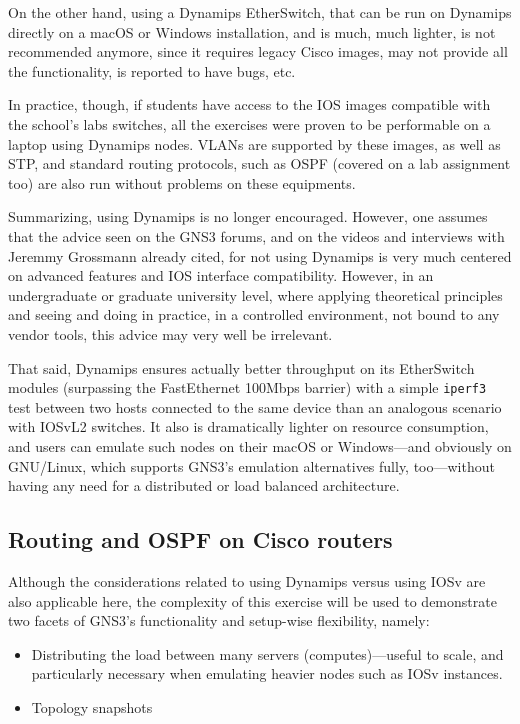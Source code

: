 On the other hand, using a Dynamips EtherSwitch, that can be run on Dynamips directly on a macOS or Windows installation, and is much, much lighter, is not recommended anymore, since it requires legacy Cisco images, may not provide all the functionality, is reported to have bugs, etc.

In practice, though, if students have access to the IOS images compatible with the school's labs switches, all the exercises were proven to be performable on a laptop using Dynamips nodes.
VLANs are supported by these images, as well as STP, and standard routing protocols, such as OSPF (covered on a lab assignment too) are also run without problems on these equipments.

Summarizing, using Dynamips is no longer encouraged.
However, one assumes that the advice seen on the GNS3 forums, and on the videos and interviews with Jeremmy Grossmann already cited, for not using Dynamips is very much centered on advanced features and IOS interface compatibility.
However, in an undergraduate or graduate university level, where applying theoretical principles and seeing and doing in practice, in a controlled environment, not bound to any vendor tools, this advice may very well be irrelevant.

That said, Dynamips ensures actually better throughput on its EtherSwitch modules (surpassing the FastEthernet 100Mbps barrier) with a simple \texttt{iperf3} test between two hosts connected to the same device than an analogous scenario with IOSvL2 switches. %
It also is dramatically lighter on resource consumption, and users can emulate such nodes on their macOS or Windows---and obviously on GNU/Linux, which supports GNS3's emulation alternatives fully, too---without having any need for a distributed or load balanced architecture.

\subsection{Routing and OSPF on Cisco routers}
\label{subsec:gns3ospfrouting}

Although the considerations related to using Dynamips versus using IOSv are also applicable here, the complexity of this exercise will be used to demonstrate two facets of GNS3's functionality and setup-wise flexibility, namely:
\begin{itemize}
  \item Distributing the load between many servers (computes)---useful to scale, and particularly necessary when emulating heavier nodes such as IOSv instances.
  \item Topology snapshots
\end{itemize}


